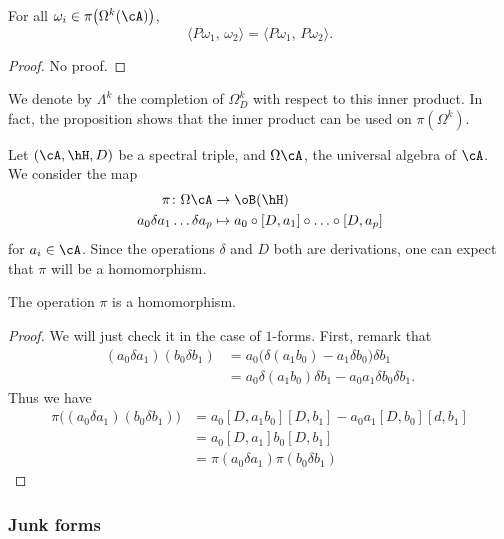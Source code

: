 \begin{proposition}
For all $\omega_i\in\pi\big( \Omega^k(\cA) \big)$,
\[
  \langle P\omega_1,\,\omega_2\rangle=\langle P\omega_1,\,P\omega_2\rangle.
\]

\end{proposition}
\begin{proof}
No proof.
\end{proof}
We denote by $\Lambda^k$ the completion of $\Omega^k_D$ with respect to this inner product. In fact, the proposition shows that the inner product can be used on $\pi(\Omega^k)$.



Let $(\cA,\hH,D)$ be a spectral triple, and $\Omega\cA$, the universal algebra of $\cA$. We consider the map
\begin{equation}	\label{EqDEfpirep}
\begin{aligned}
 \pi\colon\Omega\cA&\to \oB(\hH) \\
a_0\delta a_1\ldots\delta a_p&\mapsto a_0\circ[D,a_1]\circ\ldots\circ [D,a_p]
\end{aligned}
\end{equation}
for $a_i\in\cA$. Since the operations $\delta$ and $D$ both are derivations, one can expect that $\pi$ will be a homomorphism.

\begin{proposition}
The operation $\pi$ is a homomorphism.
\end{proposition}
\begin{proof}
We will just check it in the case of $1$-forms. First, remark that
\[
 \begin{split}
(a_0\delta a_1)(b_0\delta b_1)&=a_0\big( \delta(a_1b_0)-a_1\delta b_0 \big)\delta b_1\\
		&=a_0\delta(a_1b_0)\delta b_1-a_0a_1\delta b_0\delta b_1.
\end{split}
\]
Thus we have
\[
 \begin{split}
\pi\big( (a_0\delta a_1)(b_0\delta b_1) \big)&=a_0[D,a_1b_0][D,b_1]-a_0a_1[D,b_0][d,b_1]\\
		&=a_0[D,a_1]b_0[D,b_1]\\
  		&=\pi(a_0\delta a_1)\pi(b_0\delta b_1)
\end{split}
\]

\end{proof}

\subsubsection{Junk forms}

